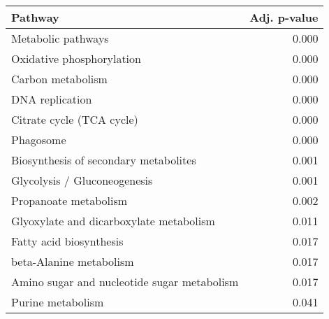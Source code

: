 \begin{tabular}{lr}
\toprule
                                     Pathway &  Adj. p-value \\
\midrule
                          Metabolic pathways &         0.000 \\
                   Oxidative phosphorylation &         0.000 \\
                           Carbon metabolism &         0.000 \\
                             DNA replication &         0.000 \\
                   Citrate cycle (TCA cycle) &         0.000 \\
                                   Phagosome &         0.000 \\
       Biosynthesis of secondary metabolites &         0.001 \\
                Glycolysis / Gluconeogenesis &         0.001 \\
                       Propanoate metabolism &         0.002 \\
     Glyoxylate and dicarboxylate metabolism &         0.011 \\
                     Fatty acid biosynthesis &         0.017 \\
                     beta-Alanine metabolism &         0.017 \\
 Amino sugar and nucleotide sugar metabolism &         0.017 \\
                           Purine metabolism &         0.041 \\
\bottomrule
\end{tabular}
